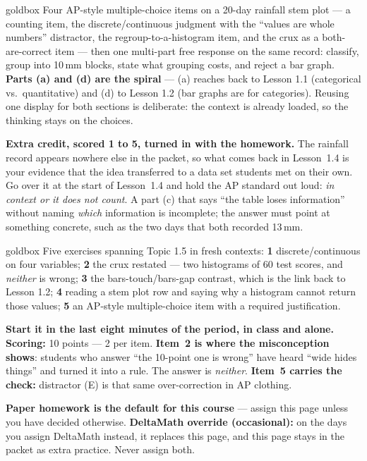 \documentclass[10pt]{article}
\begin{document}
\boxguard
\begin{skillbox}{goldbox}
Four AP-style multiple-choice items on a 20-day rainfall stem plot --- a counting item, the
discrete/continuous judgment with the ``values are whole numbers'' distractor, the
regroup-to-a-histogram item, and the crux as a both-are-correct item --- then one multi-part free
response on the same record: classify, group into 10\,mm blocks, state what grouping costs, and
reject a bar graph. \textbf{Parts (a) and (d) are the spiral} --- (a) reaches back to Lesson 1.1
(categorical vs.\ quantitative) and (d) to Lesson 1.2 (bar graphs are for categories). Reusing one
display for both sections is deliberate: the context is already loaded, so the thinking stays on
the choices.

\textbf{Extra credit, scored 1 to 5, turned in with the homework.} The rainfall
record appears nowhere else in the packet, so what comes back in Lesson~1.4 is your evidence
that the idea transferred to a data set students met on their own. Go over it at the start of
Lesson~1.4 and hold the AP standard out loud: \emph{in context or it does not count}. A part (c)
that says ``the table loses information'' without naming \emph{which} information is incomplete;
the answer must point at something concrete, such as the two days that both recorded 13\,mm.
\end{skillbox}

\boxguard
\begin{skillbox}{goldbox}
Five exercises spanning Topic 1.5 in fresh contexts: \textbf{1} discrete/continuous on four
variables; \textbf{2} the crux restated --- two histograms of 60 test scores, and \emph{neither}
is wrong; \textbf{3} the bars-touch/bars-gap contrast, which is the link back to Lesson 1.2;
\textbf{4} reading a stem plot row and saying why a histogram cannot return those values;
\textbf{5} an AP-style multiple-choice item with a required justification.

\textbf{Start it in the last eight minutes of the period, in class and alone.} \textbf{Scoring:} 10 points --- 2 per
item. \textbf{Item~2 is where the misconception shows}: students who answer ``the 10-point one is
wrong'' have heard ``wide hides things'' and turned it into a rule. The answer is \emph{neither}.
\textbf{Item~5 carries the check:} distractor (E) is that same over-correction in AP clothing.

\textbf{Paper homework is the default for this course} --- assign this page unless you have
decided otherwise. \textbf{DeltaMath override (occasional):} on the days you assign DeltaMath
instead, it replaces this page, and this page
stays in the packet as extra practice. Never assign both.
\end{skillbox}
\end{document}

